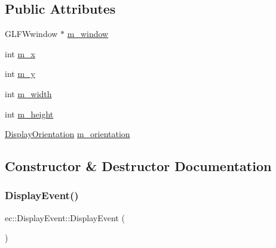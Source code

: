 \subsection*{Public Attributes}
\begin{DoxyCompactItemize}
\item 
G\+L\+F\+Wwindow $\ast$ \mbox{\hyperlink{structec_1_1_display_event_a501ab5209368544f1c264b3e25a87185}{m\+\_\+window}}
\item 
int \mbox{\hyperlink{structec_1_1_display_event_a35b371c7098cc98509f44e6fe2802945}{m\+\_\+x}}
\item 
int \mbox{\hyperlink{structec_1_1_display_event_aa4314e0538f9929b39e37bb400ac2220}{m\+\_\+y}}
\item 
int \mbox{\hyperlink{structec_1_1_display_event_ab14060df4b5ea8295712b58fce89a93a}{m\+\_\+width}}
\item 
int \mbox{\hyperlink{structec_1_1_display_event_a395871be035f491d8e894b7cacc609ba}{m\+\_\+height}}
\item 
\mbox{\hyperlink{namespaceec_a1492d2e603a780e281848af6a4bad719}{Display\+Orientation}} \mbox{\hyperlink{structec_1_1_display_event_a3d155441337a15fd45aa3584168da059}{m\+\_\+orientation}}
\end{DoxyCompactItemize}


\subsection{Constructor \& Destructor Documentation}
\mbox{\label{structec_1_1_display_event_a34ed8f096607ab02657e3599cd3d3211}} 
\subsubsection{\texorpdfstring{Display\+Event()}{DisplayEvent()}\hspace{0.1cm}{\footnotesize\ttfamily [1/2]}}
{\footnotesize\ttfamily ec\+::\+Display\+Event\+::\+Display\+Event (\begin{DoxyParamCaption}{ }\end{DoxyParamCaption})\hspace{0.3cm}{\ttfamily [explicit]}}

\mbox{\label{structec_1_1_display_event_acccf560a2179011ec33b978ce3e8ceaf}} 
